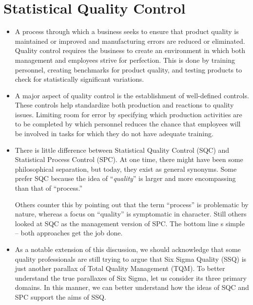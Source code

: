 \documentclass[11pt]{article} %
\begin{document}
\tableofcontents
\newpage
\large

\section{Statistical Quality Control}


\begin{itemize}
\item A process through which a business seeks to ensure that product quality is maintained or improved and manufacturing errors are reduced or eliminated. Quality control requires the business to create an environment in which both management and employees strive for perfection. 
This is done by training personnel, creating benchmarks for product quality, and testing products to check for statistically significant variations.

\item A major aspect of quality control is the establishment of well-defined controls. These controls help standardize both production and reactions to quality issues. Limiting room for error by specifying which production activities are to be completed by which personnel reduces the chance that employees will be involved in tasks for which they do not have adequate training.



\item There is little difference between Statistical Quality Control (SQC) and Statistical Process Control (SPC).  At one time, there might have been some philosophical separation, but today, they exist as general synonyms.  Some prefer SQC because the idea of “\textit{quality}” is larger and more encompassing than that of “process.” 

 Others counter this by pointing out that the term “process” is problematic by nature, whereas a focus on “quality” is symptomatic in character.  Still others looked at SQC as the management version of SPC.  The bottom line s simple – both approaches get the job done.

\item As a notable extension of this discussion, we should acknowledge that some quality professionals are still trying to argue that Six Sigma Quality (SSQ) is just another parallax of Total Quality Management (TQM).  To better understand the true parallaxes of Six Sigma, let us consider its three primary domains.  In this manner, we can better understand how the ideas of SQC and SPC support the aims of SSQ.
\end{itemize}
\end{document}
